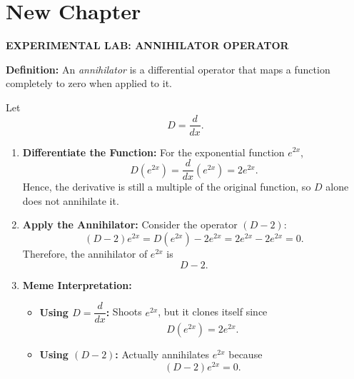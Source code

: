 \chapter{New Chapter}
\noindent
\colorbox{practicegreen}{\parbox{\dimexpr\linewidth-2\fboxsep}{\centering\small\bfseries\color{white} EXPERIMENTAL LAB: ANNIHILATOR OPERATOR}}
\vspace{15pt}

\textbf{Definition:} An \emph{annihilator} is a differential operator that maps a function completely to zero when applied to it.

Let
\[
D=\frac{d}{dx}.
\]

\begin{enumerate}
    \item \textbf{Differentiate the Function:} For the exponential function $e^{2x}$,
    \[
    D(e^{2x})=\frac{d}{dx}(e^{2x})=2e^{2x}.
    \]
    Hence, the derivative is still a multiple of the original function, so $D$ alone does not annihilate it.

    \item \textbf{Apply the Annihilator:} Consider the operator $(D-2)$:
    \[
    (D-2)e^{2x}
    =D(e^{2x})-2e^{2x}
    =2e^{2x}-2e^{2x}
    =0.
    \]
    Therefore, the annihilator of $e^{2x}$ is
    \[
    \boxed{D-2.}
    \]

    \item \textbf{Meme Interpretation:}
    \begin{itemize}
        \item \textbf{Using $D=\dfrac{d}{dx}$:}
        Shoots $e^{2x}$, but it clones itself since
        \[
        D(e^{2x})=2e^{2x}.
        \]

        \item \textbf{Using $(D-2)$:}
        Actually annihilates $e^{2x}$ because
        \[
        (D-2)e^{2x}=0.
        \]
    \end{itemize}
\end{enumerate}


